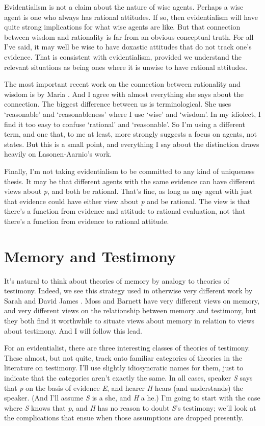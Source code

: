 Evidentialism is not a claim about the nature of wise agents. Perhaps a wise agent is one who always has rational attitudes. If so, then evidentialism will have quite strong implications for what wise agents are like. But that connection between wisdom and rationality is far from an obvious conceptual truth. For all I've said, it may well be wise to have doxastic attitudes that do not track one's evidence. That is consistent with evidentialism, provided we understand the relevant situations as being ones where it is unwise to have rational attitudes.

The most important recent work on the connection between rationality and wisdom is by Maria  \citet{Lasonen-Aarnio2010, Lasonen-Aarnio2014}. And I agree with almost everything she says about the connection. The biggest difference between us is terminological. She uses `reasonable' and `reasonableness' where I use `wise' and `wisdom'. In my idiolect, I find it too easy to confuse `rational' and `reasonable'. So I'm using a different term, and one that, to me at least, more strongly suggests a focus on agents, not states. But this is a small point, and everything I say about the distinction draws heavily on Lasonen-Aarnio's work.

Finally, I'm not taking evidentialism to be committed to any kind of uniqueness thesis. It may be that different agents with the same evidence can have different views about \emph{p}, and both be rational. That's fine, as long as any agent with just that evidence could have either view about \emph{p} and be rational. The view is that there's a function from evidence and attitude to rational evaluation, not that there's a function from evidence to rational attitude.

\section{Memory and Testimony}
\label{memoryandtestimony}

It's natural to think about theories of memory by analogy to theories of testimony. Indeed, we see this strategy used in otherwise very different work by Sarah  \citet{Moss2012} and David James  \citet{Barnett2015}. Moss and Barnett have very different views on memory, and very different views on the relationship between memory and testimony, but they both find it worthwhile to situate views about memory in relation to views about testimony. And I will follow this lead.

For an evidentialist, there are three interesting classes of theories of testimony. These almost, but not quite, track onto familiar categories of theories in the literature on testimony. I'll use slightly idiosyncratic names for them, just to indicate that the categories aren't exactly the same. In all cases, speaker \emph{S} says that \emph{p} on the basis of evidence \emph{E}, and hearer \emph{H} hears (and understands) the speaker. (And I'll assume \emph{S} is a she, and \emph{H} a he.) I'm going to start with the case where \emph{S} knows that \emph{p}, and \emph{H} has no reason to doubt \emph{S}'s testimony; we'll look at the complications that ensue when those assumptions are dropped presently.

